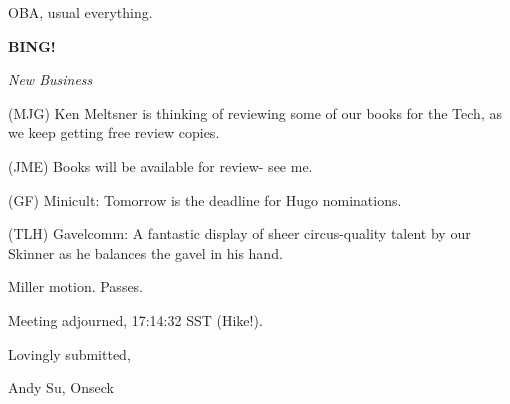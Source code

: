 \documentclass[12pt]{article}
\newcommand{\bing}{{\bf BING!} }
\newcommand{\goto}[1]{\bing \vskip 12pt \centerline{{\em{#1}}}}
\begin{document}
OBA, usual everything.

\goto{New Business}

(MJG) Ken Meltsner is thinking of reviewing some of our books for the Tech, as we keep getting free review copies.

(JME) Books will be available for review- see me.

(GF) Minicult: Tomorrow is the deadline for Hugo nominations.

(TLH) Gavelcomm: A fantastic display of sheer circus-quality talent by our Skinner as he balances the gavel in his hand.

Miller motion. Passes.

\vspace{12pt}

\noindent
Meeting adjourned, 17:14:32 SST (Hike!).

\vspace{18pt}

\centerline{Lovingly submitted,}
\centerline{Andy Su, Onseck}
\end{document}

